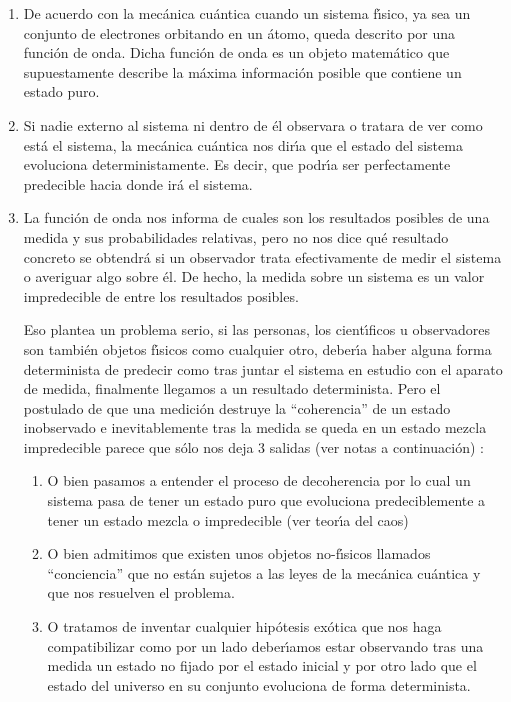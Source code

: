 \begin{enumerate}
\item  De acuerdo con la mec\'{a}nica cu\'{a}ntica cuando un sistema f\'{\i}sico, ya sea un conjunto de electrones orbitando en un \'{a}tomo, queda descrito por una funci\'{o}n de onda. Dicha funci\'{o}n de onda es un objeto matem\'{a}tico que supuestamente describe la m\'{a}xima informaci\'{o}n posible que contiene un estado puro.
\item  Si nadie externo al sistema ni dentro de \'{e}l observara o tratara de ver como est\'{a} el sistema, la mec\'{a}nica cu\'{a}ntica nos dir\'{\i}a que el estado del sistema evoluciona deterministamente. Es decir, que podr\'{\i}a ser perfectamente predecible hacia donde ir\'{a} el sistema.
\item  La funci\'{o}n de onda nos informa de cuales son los resultados posibles de una medida y sus probabilidades relativas, pero no nos dice qu\'{e} resultado concreto se obtendr\'{a} si un observador trata efectivamente de medir el sistema o averiguar algo sobre \'{e}l. De hecho, la medida sobre un sistema es un valor impredecible de entre los resultados posibles.

Eso plantea un problema serio, si las personas, los cient\'{\i}ficos u observadores son tambi\'{e}n objetos f\'{\i}sicos como cualquier otro, deber\'{\i}a haber alguna forma determinista de predecir como tras juntar el sistema en estudio con el aparato de medida, finalmente llegamos a un resultado determinista. Pero el postulado de que una medici\'{o}n destruye la ``coherencia'' de un estado inobservado e inevitablemente tras la medida se queda en un estado mezcla impredecible parece que s\'{o}lo nos deja 3 salidas (ver notas a continuaci\'{o}n) \cite{Bohm1952PRp166,Bohm1952PRp180}:
\begin{enumerate}
\item O bien pasamos a entender el proceso de decoherencia por lo cual un sistema pasa de tener un estado puro que evoluciona predeciblemente a tener un estado mezcla o impredecible (ver teor\'{\i}a del caos)
\item  O bien admitimos que existen unos objetos no-f\'{\i}sicos llamados ``conciencia'' que no est\'{a}n sujetos a las leyes de la mec\'{a}nica cu\'{a}ntica y que nos resuelven el problema.
\item  O tratamos de inventar cualquier hip\'{o}tesis ex\'{o}tica que nos haga compatibilizar como por un lado deber\'{\i}amos estar observando tras una medida un estado no fijado por el estado inicial y por otro lado que el estado del universo en su conjunto evoluciona de forma determinista.
\end{enumerate}


\end{enumerate}
